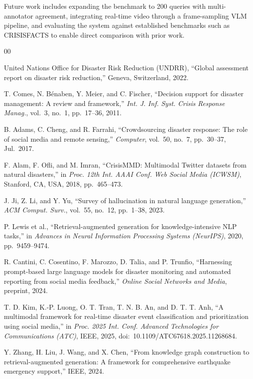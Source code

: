 Future work includes expanding the benchmark to 200 queries with multi-annotator
agreement, integrating real-time video through a frame-sampling VLM pipeline,
and evaluating the system against established benchmarks such as CRISISFACTS
to enable direct comparison with prior work.

\begin{thebibliography}{00}

 United Nations Office for Disaster Risk Reduction (UNDRR),
``Global assessment report on disaster risk reduction,''
Geneva, Switzerland, 2022.

 T. Comes, N. B\'{e}naben, Y. Meier, and C. Fischer,
``Decision support for disaster management: A review and framework,''
\textit{Int. J. Inf. Syst. Crisis Response Manag.}, vol.~3, no.~1,
pp.~17--36, 2011.

 B. Adams, C. Cheng, and R. Farrahi,
``Crowdsourcing disaster response: The role of social media and remote
sensing,'' \textit{Computer}, vol.~50, no.~7, pp.~30--37, Jul.~2017.

 F. Alam, F. Ofli, and M. Imran,
``CrisisMMD: Multimodal Twitter datasets from natural disasters,''
in \textit{Proc. 12th Int. AAAI Conf. Web Social Media (ICWSM)},
Stanford, CA, USA, 2018, pp.~465--473.

 J. Ji, Z. Li, and Y. Yu,
``Survey of hallucination in natural language generation,''
\textit{ACM Comput. Surv.}, vol.~55, no.~12, pp.~1--38, 2023.

 P. Lewis et al.,
``Retrieval-augmented generation for knowledge-intensive NLP tasks,''
in \textit{Advances in Neural Information Processing Systems (NeurIPS)},
2020, pp.~9459--9474.

 R. Cantini, C. Cosentino, F. Marozzo, D. Talia, and P. Trunfio,
``Harnessing prompt-based large language models for disaster monitoring and
automated reporting from social media feedback,''
\textit{Online Social Networks and Media}, preprint, 2024.

 T. D. Kim, K.-P. Luong, O. T. Tran, T. N. B. An, and
D. T. T. Anh, ``A multimodal framework for real-time disaster event
classification and prioritization using social media,''
in \textit{Proc. 2025 Int. Conf. Advanced Technologies for Communications
(ATC)}, IEEE, 2025, doi:~10.1109/ATC67618.2025.11268684.

 Y. Zhang, H. Liu, J. Wang, and X. Chen,
``From knowledge graph construction to retrieval-augmented generation:
A framework for comprehensive earthquake emergency support,'' IEEE, 2024.


\end{thebibliography}
